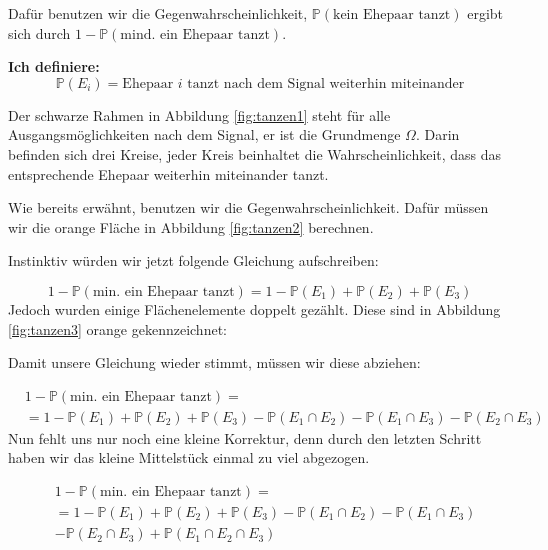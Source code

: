 {\begin{bsp}
    Dafür benutzen wir die Gegenwahrscheinlichkeit, $\mathbb P\left(\text{kein Ehepaar tanzt}\right)$ ergibt sich durch 
    $1-\mathbb P\left(\text{mind. ein Ehepaar tanzt}\right)$.

    \textbf{Ich definiere:}
    \[\mathbb P\left(E_{i}\right)=\text{Ehepaar $i$ tanzt nach dem Signal weiterhin miteinander}\]

    Der schwarze Rahmen in Abbildung \ref{fig:tanzen1} steht für alle
    Ausgangsmöglichkeiten nach dem Signal, er ist die Grundmenge $\Omega$. Darin
    befinden sich drei Kreise, jeder Kreis beinhaltet die
    Wahrscheinlichkeit, dass das entsprechende Ehepaar weiterhin
    miteinander tanzt.

    Wie bereits erwähnt, benutzen wir die Gegenwahrscheinlichkeit. Dafür
    müssen wir die orange Fläche in Abbildung \ref{fig:tanzen2} berechnen.

    Instinktiv würden wir jetzt folgende Gleichung aufschreiben:

    \[
        1-\mathbb{P}\left(\text{min. ein Ehepaar tanzt}\right)=1-\mathbb{P}(E_1)+\mathbb{P}(E_2)+\mathbb{P}(E_3)
    \]
    Jedoch wurden einige Flächenelemente doppelt gezählt. Diese sind in Abbildung \ref{fig:tanzen3} orange gekennzeichnet:

    Damit unsere Gleichung wieder stimmt, müssen wir diese abziehen:

    \begin{eqnarray*}
         &1-\mathbb{P}\left(\text{min. ein Ehepaar tanzt}\right)=\\
         &=1-\mathbb{P}(E_1)+\mathbb{P}(E_2)+\mathbb{P}(E_3)-\mathbb{P}(E_1\cap E_2)-\mathbb{P}(E_1\cap E_3)-\mathbb{P}(E_2\cap E_3)
    \end{eqnarray*}
    Nun fehlt uns nur noch eine kleine Korrektur, denn durch den letzten
    Schritt haben wir das kleine Mittelstück einmal zu viel abgezogen.

    \begin{eqnarray*}
         &1-\mathbb{P}\left(\text{min. ein Ehepaar tanzt}\right)=\\
         &=1-\mathbb{P}(E_1)+\mathbb{P}(E_2)+\mathbb{P}(E_3)-\mathbb{P}(E_1\cap E_2)-\mathbb{P}(E_1\cap E_3)\\
         &-\mathbb{P}(E_2\cap E_3)+\mathbb{P}(E_1\cap E_2\cap E_3)
    \end{eqnarray*}
	\end{bsp}

}
